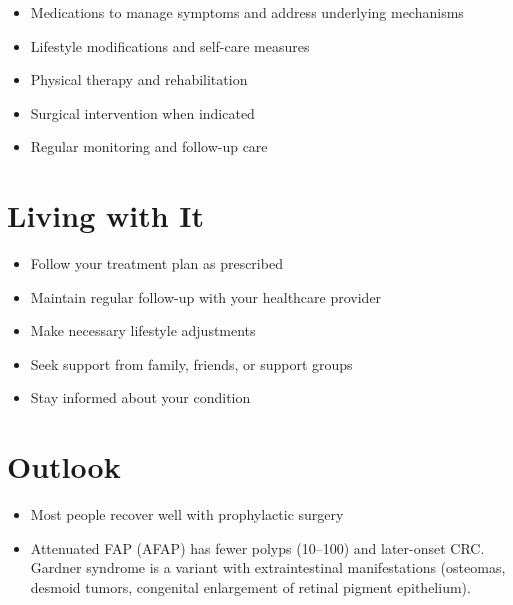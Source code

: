 \begin{itemize}[noitemsep]
  \item Medications to manage symptoms and address underlying mechanisms
  \item Lifestyle modifications and self-care measures
  \item Physical therapy and rehabilitation
  \item Surgical intervention when indicated
  \item Regular monitoring and follow-up care
\end{itemize}
\section{Living with It}
\begin{itemize}[noitemsep]
  \item Follow your treatment plan as prescribed
  \item Maintain regular follow-up with your healthcare provider
  \item Make necessary lifestyle adjustments
  \item Seek support from family, friends, or support groups
  \item Stay informed about your condition
\end{itemize}
\section{Outlook}
\begin{itemize}[noitemsep]
  \item Most people recover well with prophylactic surgery
  \item Attenuated FAP (AFAP) has fewer polyps (10--100) and later-onset CRC. Gardner syndrome is a variant with extraintestinal manifestations (osteomas, desmoid tumors, congenital enlargement of retinal pigment epithelium).
\end{itemize}
